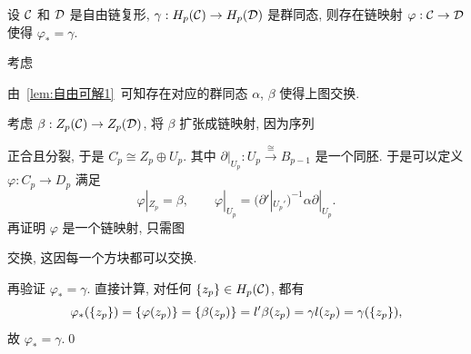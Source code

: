 \begin{Lemma}\label{lem:自由可解2}
	设 $ \mathcal{C} $ 和 $ \mathcal{D} $ 是自由链复形, $ \gamma : H_p(\mathcal{C})\to H_p(\mathcal{D}) $ 是群同态, 则存在链映射 $ \varphi : \mathcal{C}\to\mathcal{D} $ 使得 $ \varphi_*=\gamma $.
\end{Lemma}
\begin{Proof}
	考虑
	\begin{center}
	\end{center}
	由~\ref{lem:自由可解1}~可知存在对应的群同态 $ \alpha $, $ \beta $ 使得上图交换.

	考虑 $ \beta : Z_p(\mathcal{C})\to Z_p(\mathcal{D}) $, 将 $ \beta $ 扩张成链映射, 因为序列
	\begin{center}
	\end{center}
	正合且分裂, 于是 $ C_p\cong Z_p\oplus U_p $. 其中 $ \partial|_{U_p} : U_p\stackrel{\cong}{\to}B_{p-1} $ 是一个同胚. 于是可以定义 $ \varphi : C_p\to D_p $ 满足
	\[
		\varphi|_{Z_p}=\beta,\qquad \varphi|_{U_p}=(\partial'|_{U_p'})^{-1}\alpha\partial|_{U_p}.
	\]
	再证明 $ \varphi $ 是一个链映射, 只需图
	\begin{center}
	\end{center}
	交换, 这因每一个方块都可以交换.

	再验证 $ \varphi_*=\gamma $. 直接计算, 对任何 $ \left\{ z_p \right\}\in H_p(\mathcal{C}) $, 都有
	\[
		\varphi_*(\left\{ z_p \right\})=\left\{ \varphi(z_p) \right\}=\left\{ \beta(z_p) \right\}=l'\beta(z_p)=\gamma l(z_p)=\gamma(\left\{ z_p \right\}),
	\]
	故 $ \varphi_*=\gamma $.\qed
\end{Proof}

